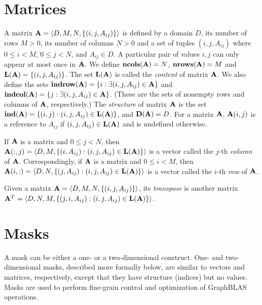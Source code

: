 \section{Matrices}
\label{Sec:Matrices}

A matrix ${\bf A} = \langle D, M, N, \{ (i,j,A_{ij}) \} \rangle$ is
defined by a domain $D$, its number of rows $M>0$, its number of columns
$N>0$ and a set of tuples $(i,j,A_{ij})$ where $0 \leq i < M$, $0 \leq
j < N$, and $A_{ij} \in D$. A particular pair of values $i,j$ can only
appear at most once in ${\bf A}$. We define $\bold{ncols}({\bf A})
= N$,  $\bold{nrows}({\bf A}) = M$ and $\bold{L}({\bf A}) =
\{ (i,j,A_{ij}) \}$.  The set $\bold{L}({\bf A})$ is called the
\emph{content} of matrix ${\bf A}$.  We also define the sets
${\bf indrow({\bf A})} = \{ i : \exists (i,j,A_{ij}) \in
{\bf A} \}$ and ${\bf indcol({\bf A})} = \{ j : \exists
(i,j,A_{ij}) \in {\bf A} \}$.  (These are the sets of nonempty
rows and columns of ${\bf A}$, respectively.)  The \emph{structure}
of matrix ${\bf A}$ is the set $\bold{ind}({\bf A}) = \{ (i,j) :
(i,j,A_{ij}) \in \bold{L}({\bf A}) \}$, and $\bold{D}({\bf A}) = D$.
For a matrix ${\bf A}$, ${\bf A}(i,j)$ is a reference to $A_{ij}$
if $(i,j,A_{ij}) \in \bold{L}({\bf A})$ and is undefined otherwise.

If ${\bf A}$ is a matrix and $0 \leq j < N$, then ${\bf A}(:,j)
= \langle D, M, \{(i,A_{ij}) : (i,j,A_{ij}) \in \bold{L}({\bf A})
\} \rangle$ is a vector called the $j$-th \emph{column}
of ${\bf A}$. Correspondingly, if ${\bf A}$ is a matrix and
$0 \leq i < M$, then ${\bf A}(i,:) = \langle D, N, \{(j,A_{ij}) :
(i,j,A_{ij}) \in \bold{L}({\bf A}) \} \rangle$ is a vector called
the $i$-th \emph{row} of ${\bf A}$.

Given a matrix ${\bf A} = \langle D, M, N, \{ (i,j,A_{ij}) \} \rangle$,
its \emph{transpose} is another matrix ${\bf A}^T = \langle D, N, M, \{
(j,i,A_{ij}) : (i,j,A_{ij}) \in \bold{L}({\bf A}) \} \rangle$.

\section{Masks}
\label{Sec:Masks}

A mask can be either a one- or a two-dimensional construct.  One- and
two-dimensional masks, described more formally below, are similar to
vectors and matrices, respectively, except that they have structure
(indices) but no values. Masks are used to perform fine-grain control
and optimization of GraphBLAS operations.

